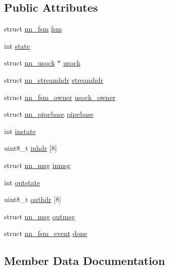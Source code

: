 \subsection*{Public Attributes}
\begin{DoxyCompactItemize}
\item 
struct \hyperlink{structnn__fsm}{nn\+\_\+fsm} \hyperlink{structnn__stcp_a6ae6405087cd203f95f03e51ce4ed670}{fsm}
\item 
int \hyperlink{structnn__stcp_afba37d373a3ba23254bea9e094d1ad62}{state}
\item 
struct \hyperlink{structnn__usock}{nn\+\_\+usock} $\ast$ \hyperlink{structnn__stcp_a76f77fd461d033a021244ef1b9f79b40}{usock}
\item 
struct \hyperlink{structnn__streamhdr}{nn\+\_\+streamhdr} \hyperlink{structnn__stcp_a83d9f7a873f7e82006bfb888aab05c9f}{streamhdr}
\item 
struct \hyperlink{structnn__fsm__owner}{nn\+\_\+fsm\+\_\+owner} \hyperlink{structnn__stcp_a973e075ff7bd5addceccbb5e4f44a149}{usock\+\_\+owner}
\item 
struct \hyperlink{structnn__pipebase}{nn\+\_\+pipebase} \hyperlink{structnn__stcp_a1304b5f2b79734de08ab7a8a0d31798d}{pipebase}
\item 
int \hyperlink{structnn__stcp_a9a5d83789ce757a68a2fe573b5d0f011}{instate}
\item 
uint8\+\_\+t \hyperlink{structnn__stcp_a6c472c5010d33a6ebf2fe19ce846292f}{inhdr} \mbox{[}8\mbox{]}
\item 
struct \hyperlink{structnn__msg}{nn\+\_\+msg} \hyperlink{structnn__stcp_ad60769e6d407ebbd3e8b550bbc09fe4c}{inmsg}
\item 
int \hyperlink{structnn__stcp_ac616d48e415897b1878472eb3082ebe0}{outstate}
\item 
uint8\+\_\+t \hyperlink{structnn__stcp_a1b9bc319864703068bce14c560f20cf5}{outhdr} \mbox{[}8\mbox{]}
\item 
struct \hyperlink{structnn__msg}{nn\+\_\+msg} \hyperlink{structnn__stcp_a52236d63d9223804caf4af2fc4f71031}{outmsg}
\item 
struct \hyperlink{structnn__fsm__event}{nn\+\_\+fsm\+\_\+event} \hyperlink{structnn__stcp_a33f2cd36de28df5d28ce7fe949dddde5}{done}
\end{DoxyCompactItemize}


\subsection{Member Data Documentation}
